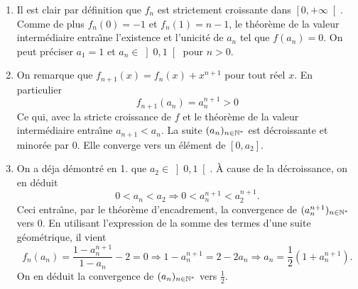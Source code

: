
\begin{enumerate}
\item  Il est clair par d{\'e}finition que $f_{n}$ est strictement croissante dans $\left[ 0,+\infty \right[ $. Comme de plus $f_{n}(0)=-1$ et $f_{n}(1)=n-1$, le th{\'e}or{\`e}me de la valeur interm{\'e}diaire entra\^{\i }ne l'existence et l'unicit{\'e} de $a_{n}$ tel que $f(a_{n})=0$. On peut pr{\'e}ciser $a_{1}=1$ et $a_{n}\in \left]0,1\right[ $ pour $n>0$.

\item  On remarque que $f_{n+1}(x)=f_{n}(x)+x^{n+1}$ pour tout r{\'e}el $x$. En particulier
\begin{displaymath}
f_{n+1}(a_{n})=a_{n}^{n+1}>0 
\end{displaymath}
Ce qui, avec la stricte croissance de $f$ et le th{\'e}or{\`e}me de la valeur interm{\'e}diaire entra\^{\i }ne $a_{n+1}<a_{n}$. La suite $(a_{n})_{n\in \mathbb{N}^{*}}$ est d{\'e}croissante et minor{\'e}e par 0. Elle converge vers un {\'e}l{\'e}ment de $\left[ 0,a_{2}\right]$.

\item  On a d{\'e}ja d{\'e}montr{\'e} en 1. que $a_{2}\in \left] 0,1\right[ $. \`A cause de la d{\'e}croissance, on en d{\'e}duit
\begin{displaymath}
0<a_{n}<a_{2} \Rightarrow 0<a_{n}^{n+1}<a_{2}^{n+1}. 
\end{displaymath}
Ceci entra\^{\i }ne, par le théorème d'encadrement, la convergence de $(a_{n}^{n+1})_{n\in \mathbb{N}^{*}}$ vers
0.\newline
En utilisant l'expression de la somme des termes d'une suite g{\'e}om{\'e}trique, il vient
\[
f_{n}(a_{n})  = \frac{1-a_{n}^{n+1}}{1-a_{n}}-2=0 \Rightarrow 
1-a_{n}^{n+1} = 2-2a_{n} \Rightarrow
a_{n} = \frac{1}{2}(1+a_{n}^{n+1}).
\]
On en déduit la convergence de $(a_{n})_{n\in \mathbb{N}^{*}}$ vers $\frac{1}{2}$.


\end{enumerate}
